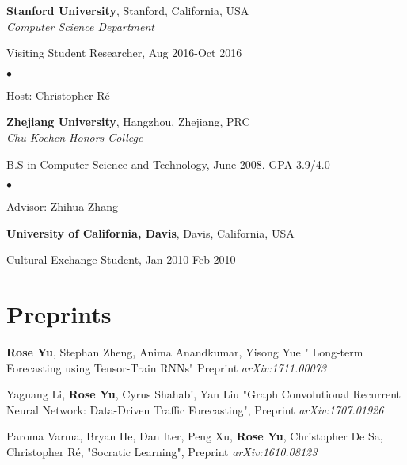 \documentclass[margin,line]{res}
\newenvironment{list1}{
  \begin{list}{\ding{113}}{%
      \setlength{\itemsep}{0in}
      \setlength{\parsep}{0in} \setlength{\parskip}{0in}
      \setlength{\topsep}{0in} \setlength{\partopsep}{0in} 
      \setlength{\leftmargin}{0.17in}}}{\end{list}}
\newenvironment{list2}{
  \begin{list}{$\bullet$}{%
      \setlength{\itemsep}{0in}
      \setlength{\parsep}{0in} \setlength{\parskip}{0in}
      \setlength{\topsep}{0in} \setlength{\partopsep}{0in} 
      \setlength{\leftmargin}{0.2in}}}{\end{list}}
\begin{document}
\begin{resume}
\begin{list1}
\vspace*{.05in}
\end{list1}
{\bf Stanford University}, Stanford, California, USA\\
{\em Computer Science Department } 
\begin{list1}
	\item[] Visiting Student Researcher,  Aug 2016-Oct 2016
	\begin{list2}
		\vspace*{.05in}
		\item Host:  Christopher R\'e
	\end{list2}
\end{list1}

{\bf Zhejiang University}, Hangzhou, Zhejiang, PRC\\
{\em Chu Kochen Honors College} 
\begin{list1}
\item[] B.S in Computer Science and Technology,  June 2008. GPA 3.9/4.0
\begin{list2}
\vspace*{.05in}
\item Advisor:  Zhihua Zhang
\end{list2}
\end{list1}

{\bf University of California, Davis}, Davis, California, USA\\
\vspace*{-.1in}
\begin{list1}
\item[] Cultural Exchange Student, Jan 2010-Feb 2010
\end{list1}




\section{\sc Preprints}

{\bf Rose Yu}, Stephan Zheng, Anima Anandkumar, Yisong Yue
" Long-term Forecasting using Tensor-Train RNNs"
Preprint \textit{arXiv:1711.00073}


Yaguang Li, {\bf Rose Yu}, Cyrus Shahabi, Yan Liu
"Graph Convolutional Recurrent Neural Network: Data-Driven Traffic Forecasting",
Preprint \textit{arXiv:1707.01926}

Paroma Varma, Bryan He, Dan Iter, Peng Xu, {\bf Rose Yu}, Christopher De Sa,  Christopher R\'e,  "Socratic Learning",
Preprint \textit{arXiv:1610.08123}


\end{resume}
\end{document}
